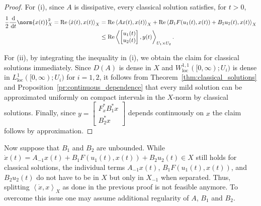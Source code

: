 \documentclass{cocv}
\renewcommand{\d}{\,\mathrm{d}}
\renewcommand{\Re}{\mathrm{Re}}
\newcommand{\inprod}[2]{\left\langle#1,#2\right\rangle}
\DeclareMathOperator{\loc}{loc}
\theoremstyle{definition}
\begin{document}
\begin{proof}
    For (i), since $A$ is dissipative, every classical solution satisfies, for $t>0$,
    \begin{equation*}
    \begin{aligned}
        \frac12\frac{\d}{\d t}\norm{x(t)}_X^2 = \Re \inprod{\dot x(t)}{x(t)}_X &= \Re \inprod{Ax(t)}{x(t)}_X + \Re\inprod{B_1F(u_1(t),x(t)) + B_2u_2(t)}{x(t)}_X\\
        &\le \Re \inprod{\begin{bmatrix}u_1(t) \\ u_2(t)\end{bmatrix}}{y(t)}_{U_1 \times U_2}.
    \end{aligned}
    \end{equation*}

    For (ii), by integrating the inequality in (i), we obtain the claim for classical solutions immediately. Since $D(A)$ is dense in $X$ and $ W^{1, 1}_{\loc}([0, \infty);U_i)$ is dense in $L^{1}_{\loc}([0, \infty);U_i)$ for $i =1,2$, it follows from Theorem~\ref{thm:classical_solutions} and Proposition~\ref{pr:continuous_dependence} that every mild solution can be approximated uniformly on compact intervals in the $X$-norm by classical solutions. Finally, since $y = \begin{bmatrix}F_x^* B_1^*x \\ B_2^*x\end{bmatrix}$ depends continuously on $x$ the claim follows by approximation.
\end{proof}

Now suppose that $B_1$ and $B_2$ are unbounded. While $\dot{x}(t) = A_{-1}x(t) + B_1F(u_1(t),x(t)) + B_2u_2(t) \in X$ still holds for classical solutions, the individual terms $A_{-1}x(t)$, $B_1F(u_1(t),x(t))$, and $B_2u_2(t)$ do not have to be in $X$ but only in $X_{-1}$ when separated. Thus, splitting $\inprod{\dot x}{x}_X$ as done in the previous proof is not feasible anymore.
To overcome this issue one may assume additional regularity of $A$, $B_1$ and $B_2$.
\end{document}
